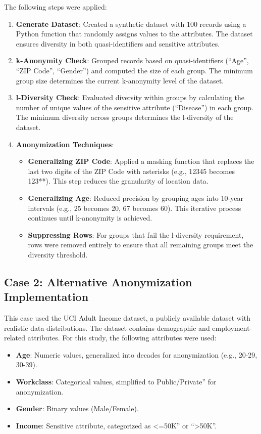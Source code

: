 \documentclass[conference]{IEEEtran}
\begin{document}
	The following steps were applied:
	\begin{enumerate}
		\item \textbf{Generate Dataset}: Created a synthetic dataset with 100 records using a Python function that randomly assigns values to the attributes. The dataset ensures diversity in both quasi-identifiers and sensitive attributes.
		\item \textbf{k-Anonymity Check}: Grouped records based on quasi-identifiers (``Age'', ``ZIP Code'', ``Gender'') and computed the size of each group. The minimum group size determines the current k-anonymity level of the dataset.
		\item \textbf{l-Diversity Check}: Evaluated diversity within groups by calculating the number of unique values of the sensitive attribute (``Disease'') in each group. The minimum diversity across groups determines the l-diversity of the dataset.
		\item \textbf{Anonymization Techniques}:
		\begin{itemize}
			\item \textbf{Generalizing ZIP Code}: Applied a masking function that replaces the last two digits of the ZIP Code with asterisks (e.g., 12345 becomes 123**). This step reduces the granularity of location data.
			\item \textbf{Generalizing Age}: Reduced precision by grouping ages into 10-year intervals (e.g., 25 becomes 20, 67 becomes 60). This iterative process continues until k-anonymity is achieved.
			\item \textbf{Suppressing Rows}: For groups that fail the l-diversity requirement, rows were removed entirely to ensure that all remaining groups meet the diversity threshold.
		\end{itemize}
	\end{enumerate}
	
\subsection{Case 2: Alternative Anonymization Implementation}

This case used the UCI Adult Income dataset, a publicly available dataset with realistic data distributions. The dataset contains demographic and employment-related attributes. For this study, the following attributes were used: \begin{itemize} \item \textbf{Age}: Numeric values, generalized into decades for anonymization (e.g., 20-29, 30-39). \item \textbf{Workclass}: Categorical values, simplified to Public/Private'' for anonymization. \item \textbf{Gender}: Binary values (Male/Female). \item \textbf{Income}: Sensitive attribute, categorized as <=50K'' or ``>50K''. \end{itemize}
\end{document}
